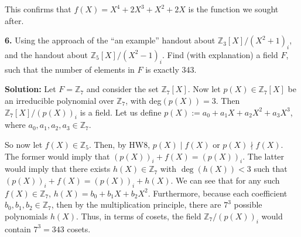 \documentclass[12pt, a4paper]{article}
\begin{document}
\vspace{4mm}

\noindent This confirms that $f(X)=X^4+2X^3+X^2+2X$ is the function we sought after.

\vspace{6mm}

\noindent\textbf{6.} Using the approach of the ``an example'' handout about $\mathbb{Z}_3[X]/(X^2+1)_i$, and the handout about $\mathbb{Z}_5[X]/(X^2-1)_i$. Find (with explanation) a field $F$, such that the number of elements in $F$ is exactly 343.

\vspace{4mm}

\noindent\textbf{Solution:} Let $F=\mathbb{Z}_7$ and consider the set $\mathbb{Z}_7[X]$. Now let $p(X)\in\mathbb{Z}_7[X]$ be an irreducible polynomial over $\mathbb{Z}_7$, with deg$(p(X))=3$. Then $\mathbb{Z}_7[X]/(p(X))_i$ is a field. Let us define $p(X):=a_0+a_1X+a_2X^2+a_3X^3$, where $a_0,a_1,a_2,a_3\in\mathbb{Z}_7$.\par 
So now let $f(X)\in\mathbb{Z}_5$. Then, by HW8, $p(X)\mid f(X)$ or $p(X)\nmid f(X)$. The former would imply that $(p(X))_i+f(X)=(p(X))_i$. The latter would imply that there exists $h(X)\in\mathbb{Z}_7$ with $\deg(h(X))<3$ such that $(p(X))_i+f(X)=(p(X))_i+h(X)$. We can see that for any such $f(X)\in\mathbb{Z}_7$, $h(X)=b_0+b_1X+b_2X^2$. Furthermore, because each coefficient $b_0,b_1,b_2\in\mathbb{Z}_7$, then by the multiplication principle, there are $7^3$ possible polynomials $h(X)$. Thus, in terms of cosets, the field $\mathbb{Z}_7/(p(X))_i$ would contain $7^3=343$ cosets.
   















 
\end{document}
